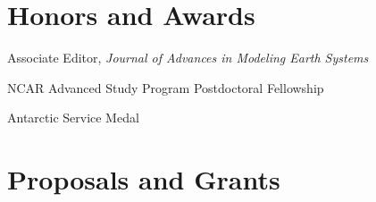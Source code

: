 \documentclass[11pt]{article}
\begin{document}
\section{Honors and Awards}

\begin{description}[style=multiline,leftmargin=2.5cm,font=\normalfont]
\item[2022--] Associate Editor, \textit{Journal of Advances in Modeling Earth Systems}
\item[2010--2012] NCAR Advanced Study Program Postdoctoral Fellowship
\item[2006] Antarctic Service Medal
\end{description}


\section{Proposals and Grants}
\end{document}
